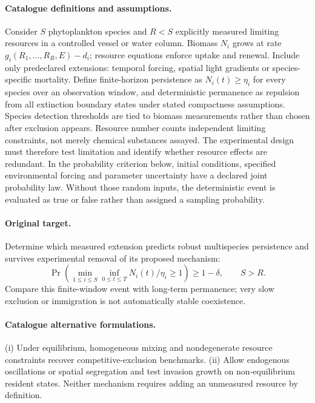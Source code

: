 \documentclass[11pt]{article}
\begin{document}
\paragraph{Catalogue definitions and assumptions.}
Consider $S$ phytoplankton species and $R<S$ explicitly measured limiting resources in a controlled vessel or water column. Biomass $N_i$ grows at rate $g_i(R_1,\ldots,R_R,E)-d_i$; resource equations enforce uptake and renewal. Include only predeclared extensions: temporal forcing, spatial light gradients or species-specific mortality. Define finite-horizon persistence as $N_i(t)\ge\eta_i$ for every species over an observation window, and deterministic permanence as repulsion from all extinction boundary states under stated compactness assumptions. Species detection thresholds are tied to biomass measurements rather than chosen after exclusion appears. Resource number counts independent limiting constraints, not merely chemical substances assayed. The experimental design must therefore test limitation and identify whether resource effects are redundant. In the probability criterion below, initial conditions, specified environmental forcing and parameter uncertainty have a declared joint probability law. Without those random inputs, the deterministic event is evaluated as true or false rather than assigned a sampling probability.
\paragraph{Original target.}
Determine which measured extension predicts robust multispecies persistence and survives experimental removal of its proposed mechanism:
\[
 \Pr\!\left(\min_{1\le i\le S}\inf_{0\le t\le T}
 N_i(t)/\eta_i\ge1\right)\ge1-\delta,
 \qquad S>R.
\]
Compare this finite-window event with long-term permanence; very slow exclusion or immigration is not automatically stable coexistence.
\paragraph{Catalogue alternative formulations.}
(i) Under equilibrium, homogeneous mixing and nondegenerate resource constraints recover competitive-exclusion benchmarks. (ii) Allow endogenous oscillations or spatial segregation and test invasion growth on non-equilibrium resident states. Neither mechanism requires adding an unmeasured resource by definition.
\end{document}
